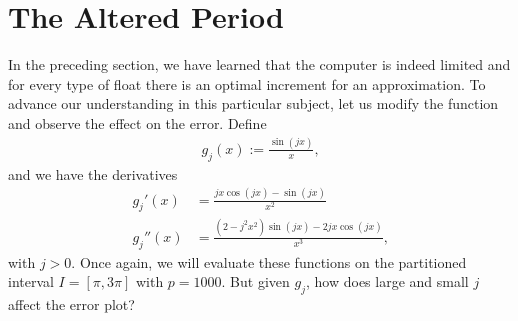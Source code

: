 \section{The Altered Period}

In the preceding section, we have learned that the computer is indeed limited and for every type of float there is an optimal increment for an approximation. To advance our understanding in this particular subject, let us modify the function and observe the effect on the error. Define
\begin{align*}
    g_j(x) := \frac{\sin(j x)}{x} \text{,}
\end{align*}
and we have the derivatives
\begin{align*}
    g_j'(x) &= \frac{j x \cos(jx) - \sin(jx)}{x^2} \\
    g_j''(x) &= \frac{(2 - j^2 x^2)\sin(jx) - 2 j x \cos(jx)}{x^3} \text{,}
\end{align*}
with \(j > 0\). Once again, we will evaluate these functions on the partitioned interval \(I = [\pi, 3\pi]\) with \(p = 1000\). But given \(g_j\), how does large and small \(j\) affect the error plot?


